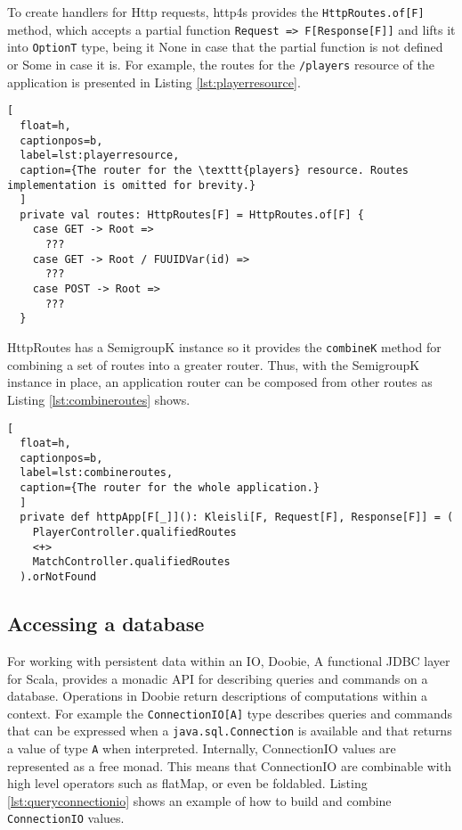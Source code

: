 \documentclass[../main.tex]{subfiles}
\begin{document}
To create handlers for Http requests, http4s provides the \texttt{HttpRoutes.of[F]} method, which accepts a partial
function \texttt{Request => F[Response[F]]} and lifts it into \texttt{OptionT} type,
being it None in case that the partial function is not defined or Some in case
it is. For example, the routes for the \texttt{/players} resource of the
application is presented in Listing \ref{lst:playerresource}.

\begin{lstlisting}[
  float=h,
  captionpos=b,
  label=lst:playerresource,
  caption={The router for the \texttt{players} resource. Routes implementation is omitted for brevity.}
  ]
  private val routes: HttpRoutes[F] = HttpRoutes.of[F] {
    case GET -> Root =>
      ???
    case GET -> Root / FUUIDVar(id) =>
      ???
    case POST -> Root =>
      ???
  }
\end{lstlisting}

HttpRoutes has a SemigroupK instance so it provides the \texttt{combineK} method
for combining a set of routes into a greater router. Thus, with the SemigroupK
instance in place, an application router can be composed from other routes as Listing
\ref{lst:combineroutes} shows.

\begin{lstlisting}[
  float=h,
  captionpos=b,
  label=lst:combineroutes,
  caption={The router for the whole application.}
  ]
  private def httpApp[F[_]](): Kleisli[F, Request[F], Response[F]] = (
    PlayerController.qualifiedRoutes
    <+>
    MatchController.qualifiedRoutes
  ).orNotFound
\end{lstlisting}

\subsection{Accessing a database}
For working with persistent data within an IO, Doobie, A functional JDBC layer for Scala,
provides a monadic API for describing
queries and commands on a database. Operations in Doobie return descriptions of
computations within a context. For example the \texttt{ConnectionIO[A]} type
describes queries and commands that can be expressed when a
\texttt{java.sql.Connection} is available and that returns a value of type
\texttt{A} when interpreted. Internally, ConnectionIO values are represented as a
free monad. This means that ConnectionIO are combinable with high level
operators such as flatMap, or even be foldabled. Listing \ref{lst:queryconnectionio} shows an
example of how to build and combine \texttt{ConnectionIO} values.
\end{document}
